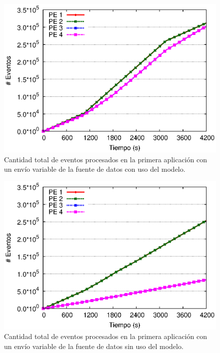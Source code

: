 \begin{figure}[!ht]
\centering
    \includegraphics[scale=0.7]{images/exp/app1/normal/cm/eventCount.eps}
    \caption{Cantidad total de eventos procesados en la primera aplicaci\'on con un env\'io variable de la fuente de datos con uso del modelo.}
    \label{fig:app1-normal-eventCount-cm}
\end{figure}

\begin{figure}[!ht]
\centering
    \includegraphics[scale=0.7]{images/exp/app1/normal/sm/eventCount.eps}
    \caption{Cantidad total de eventos procesados en la primera aplicaci\'on con un env\'io variable de la fuente de datos sin uso del modelo.}
    \label{fig:app1-normal-eventCount-sm}
\end{figure}

